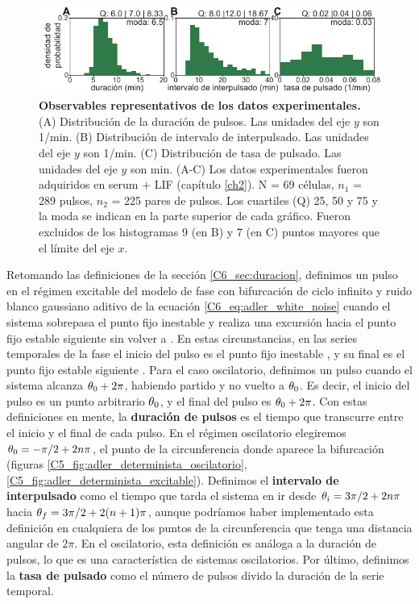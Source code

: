 \documentclass[./main.tex]{subfiles}
\begin{document}
\begin{figure}
    \centering
    \includegraphics[width=1\columnwidth]{figures/chapter6/C6_experimental_stats.pdf} 
    \caption{\textbf{Observables representativos de los datos experimentales.} (A) Distribución de la duración de pulsos. Las unidades del eje $y$ son 1/min. (B) Distribución de intervalo de interpulsado. Las unidades del eje $y$ son 1/min. (C) Distribución de tasa de pulsado. Las unidades del eje $y$ son min. (A-C) Los datos experimentales fueron adquiridos en serum + LIF (capítulo \ref{ch2}). N = 69 células, $n_1$ = 289 pulsos, $n_2$ = 225 pares de pulsos. Los cuartiles (Q) 25, 50 y 75 y la moda se indican en la parte superior de cada gráfico. Fueron excluidos de los histogramas 9 (en B) y 7 (en C) puntos mayores que el límite del eje $x$.}
    \label{C6_fig:observables_experimentales}
\end{figure}


Retomando las definiciones de la sección \ref{C6_sec:duracion}, definimos un pulso en el régimen excitable del modelo de fase con bifurcación de ciclo infinito y ruido blanco gaussiano aditivo de la ecuación \ref{C6_eq:adler_white_noise} cuando el sistema sobrepasa el punto fijo inestable \xxi y realiza una excursión hacia el punto fijo estable siguiente \xxe sin volver a \xxi. En estas circunstancias, en las series temporales de la fase el inicio del pulso es el punto fijo inestable \xxi, y su final es el punto fijo estable siguiente \xxe. Para el caso oscilatorio, definimos un pulso cuando el sistema alcanza $\theta_0+2\pi$, habiendo partido y no vuelto a $\theta_0$.  Es decir, el inicio del pulso es un punto arbitrario $\theta_0$, y el final del pulso es $\theta_0+2\pi$. Con estas definiciones en mente, la \textbf{duración de pulsos} es el tiempo que transcurre entre el inicio y el final de cada pulso. En el régimen oscilatorio elegiremos $\theta_0 = -\pi/2 + 2n\pi$, el punto de la circunferencia donde aparece la bifurcación (figuras \ref{C5_fig:adler_determinista_oscilatorio},\ref{C5_fig:adler_determinista_excitable}). Definimos el \textbf{intervalo de interpulsado} como el tiempo que tarda el sistema en ir desde $\theta_i = 3\pi/2+ 2n\pi$ hacia $\theta_f = 3\pi/2 + 2(n+1)\pi$, aunque podríamos haber implementado esta definición en cualquiera de los puntos de la circunferencia que tenga una distancia angular de $2\pi$. En el oscilatorio, esta definición es análoga a la duración de pulsos, lo que es una característica de sistemas oscilatorios. Por último, definimos la \textbf{tasa de pulsado} como el número de pulsos divido la duración de la serie temporal.  
\end{document}
